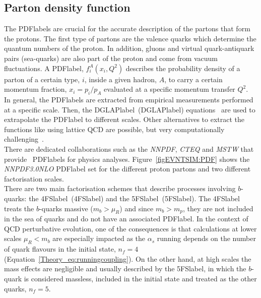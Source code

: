 \subsection{Parton density function}

The \acrshort{PDFlabel}s are crucial for the accurate description of the partons that form the protons. The first type of partons are the valence quarks which determine the quantum numbers of the proton. In addition, gluons and virtual quark-antiquark pairs (sea-quarks) are also part of the proton and come from vacuum fluctuations. A \acrshort{PDFlabel}, $f_i^A(x_i,Q^2)$ describes the probability density of a parton of a certain type, $i$, inside a given hadron, $A$, to carry a certain momentum fraction, $x_i=p_i/p_A$ evaluated at a specific momentum transfer $Q^2$.\\

In general, the \acrshort{PDFlabel}s are extracted from empirical measurements performed at a specific scale. Then, the \acrlong{DGLAPlabel}~(\acrshort{DGLAPlabel}) equations~\cite{DGLAP1,DGLAP2,DGLAP3} are used to extrapolate the \acrshort{PDFlabel} to different scales. Other alternatives to extract the functions like using lattice \acrshort{QCD} are possible, but very computationally challenging~\cite{Bhat_2021}.\\

There are dedicated collaborations such as the \textit{NNPDF}, \textit{CTEQ} and \textit{MSTW} that provide~\cite{Ball_2015,LesHouches,Martin_2009}
 \acrshort{PDFlabel}s for physics analyses. Figure~\ref{figEVNTSIM:PDF} shows the \textit{NNPDF3.0NLO} \acrshort{PDFlabel} set for the different proton partons and two different factorisation scales.\\

 There are two main factorisation schemes that describe processes involving $b$-quarks: the \acrlong{4FSlabel}~(\acrshort{4FSlabel}) and the \acrlong{5FSlabel}~(\acrshort{5FSlabel}). The \acrshort{4FSlabel} treats the $b$-quarks massive ($m_b>\mu_R$) and since $m_b>m_p$, they are not included in the sea of quarks and do not have an associated \acrshort{PDFlabel}. In the context of \acrshort{QCD} perturbative evolution, one of the consequences is that calculations at lower scales $\mu_R<m_b$ are especially impacted as the $\alpha_s$ running depends on the number of quark flavours in the initial state, $n_f=4$ (Equation~\ref{Theory_eq:runningcoupling}). On the other hand, at high scales the mass effects are negligible and usually described by the \acrshort{5FSlabel}, in which the $b$-quark is considered massless, included in the initial state and treated as the other quarks, $n_f=5$. 


